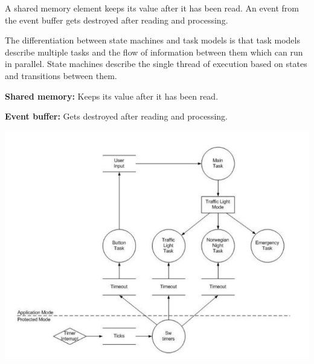 A shared memory element keeps its value after it has been read.
An event from the event buffer gets destroyed after reading and processing.

The differentiation between state machines and task models is that
task models describe multiple tasks and the flow of information between them
which can run in parallel. State machines describe the single thread of
execution based on states and transitions between them.

\textbf{Shared memory:} Keeps its value after it has been read.

\textbf{Event buffer:} Gets destroyed after reading and processing.


\begin{center}
	\includegraphics[width=\textwidth]{images/taskmodel2.png}
\end{center}

